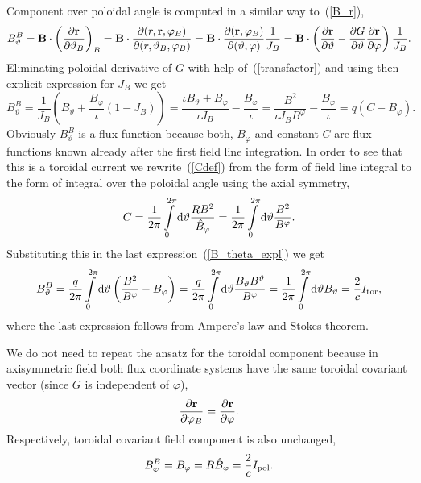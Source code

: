 \documentclass[12pt]{article}
\newcommand{\be}[1]{\begin{equation} \label{#1}}
\newcommand{\ee}{\end{equation}}
\newcommand{\bea}[1]{\begin{eqnarray} \label{#1}}
\newcommand{\eea}{\end{eqnarray}}
\newcommand{\eq}[1]{(\ref{#1})}
\newcommand{\difp}[2]{\frac{\partial #1}{\partial #2}}
\newcommand{\br}{{\bf r}}
\newcommand{\bB}{{\bf B}}
\newcommand{\rd}{{\rm d}}
\begin{document}
\noindent
Component over poloidal angle is computed in a similar way to~\eq{B_r},
\be{B_theta}
B_\vartheta^B = \bB\cdot\left(\difp{\br}{\vartheta_B}\right)_B = \bB\cdot\difp{(r,\br,\varphi_B)}{(r,\vartheta_B,\varphi_B)}
= \bB\cdot\difp{(\br,\varphi_B)}{(\vartheta,\varphi)}\frac{1}{J_B}
= \bB\cdot\left(\difp{\br}{\vartheta}-\difp{G}{\vartheta}\difp{\br}{\varphi}\right)\frac{1}{J_B}.
\ee
Eliminating poloidal derivative of $G$ with help of~\eq{transfactor} and using then explicit expression for $J_B$ we get
\be{B_theta_expl}
B_\vartheta^B = \frac{1}{J_B}\left(B_\vartheta+\frac{B_\varphi}{\iota}\left(1-J_B\right)\right)
=\frac{\iota B_\vartheta+B_\varphi}{\iota J_B} - \frac{B_\varphi}{\iota}
=\frac{B^2}{\iota J_B B^\varphi} - \frac{B_\varphi}{\iota}
=q \left(C-B_\varphi\right).
\ee
Obviously $B_\vartheta^B$ is a flux function because both, $B_\varphi$ and constant $C$ are flux functions known already after the 
first field line integration. In order to see that this is a toroidal current we rewrite~\eq{Cdef} from the form of field line integral
to the form of integral over the poloidal angle using the axial symmetry,
\be{Cdef_pol}
C = \frac{1}{2\pi} \int\limits_0^{2\pi} \rd\vartheta \frac{R B^2}{\hat B_\varphi}
= \frac{1}{2\pi} \int\limits_0^{2\pi} \rd\vartheta \frac{B^2}{B^\varphi}.
\ee
Substituting this in the last expression~\eq{B_theta_expl} we get
\bea{torcurr}
B_\vartheta^B 
=\frac{q}{2\pi} \int\limits_0^{2\pi} \rd\vartheta \left(\frac{B^2}{B^\varphi}-B_\varphi\right)
=\frac{q}{2\pi} \int\limits_0^{2\pi} \rd\vartheta \frac{B_\vartheta B^\vartheta}{B^\varphi}
=\frac{1}{2\pi} \int\limits_0^{2\pi} \rd\vartheta B_\vartheta =\frac{2}{c} I_{\rm tor},
\eea
where the last expression follows from Ampere's law and Stokes theorem.

\noindent
We do not need to repeat the ansatz for the toroidal component because in axisymmetric field both flux coordinate systems
have the same toroidal covariant vector (since $G$ is independent of $\varphi$),
\be{bothsame}
\difp{\br}{\varphi_B}=\difp{\br}{\varphi}.
\ee
Respectively, toroidal covariant field component is also unchanged,
\be{B_phi}
B_\varphi^B = B_\varphi = R \hat B_\varphi=\frac{2}{c} I_{\rm pol}.
\ee
\end{document}
